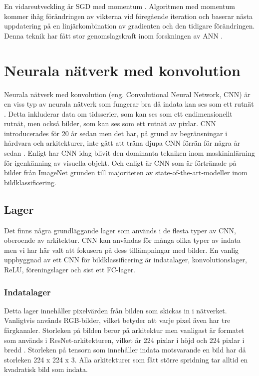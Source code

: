 \documentclass[]{kththesis}
\begin{document}
En vidareutveckling är SGD med momentum \parencite{qian1999momentum}. Algoritmen med momentum kommer ihåg förändringen av vikterna vid föregående iteration och baserar nästa uppdatering på en linjärkombination av gradienten och den tidigare förändringen. Denna teknik har fått stor genomslagskraft inom forskningen av ANN \parencite{sutskever2013importance}.

\section{Neurala nätverk med konvolution}
Neurala nätverk med konvolution (eng. Convolutional Neural Network, CNN) är en viss typ av neurala nätverk som fungerar bra då indata kan ses som ett rutnät \parencite{Goodfellow-et-al-2016}. Detta inkluderar data om tidsserier, som kan ses som ett endimensionellt rutnät, men också bilder, som kan ses som ett rutnät av pixlar. CNN introducerades för 20 år sedan men det har, på grund av begränsningar i hårdvara och arkitekturer, inte gått att träna djupa CNN förrän för några år sedan \parencite{huang2017densely}. Enligt \textcite{huang2017densely} har CNN idag blivit den dominanta tekniken inom maskininlärning för igenkänning av visuella objekt. Och enligt \textcite{simon2016imagenet} är CNN som är förtränade på bilder från ImageNet grunden till majoriteten av state-of-the-art-modeller inom bildklassificering.

\subsection{Lager}
Det finns några grundläggande lager som används i de flesta typer av CNN, oberoende av arkitektur. CNN kan användas för många olika typer av indata men vi har här valt att fokusera på dess tillämpningar med bilder. En vanlig uppbyggnad av ett CNN för bildklassificering är indatalager, konvolutionslager, ReLU, föreningslager och sist ett FC-lager.

\subsubsection{Indatalager}
Detta lager innehåller pixel\-värden från bild\-en som skickas in i nät\-verk\-et. Van\-ligt\-vis används RGB-bilder, vilket betyder att varje pixel även har tre färg\-kanaler. Stor\-leken på bilden beror på arkitektur men vanligast är formatet som används i ResNet-arkitekturen, vilket är 224 pixlar i höjd och 224 pixlar i bredd \parencite{krizhevsky2012imagenet}. Storleken på tensorn som innehåller indata motsvarande en bild har då storleken 224 x 224 x 3. Alla arkitekturer som fått större spridning tar alltid en kvadratisk bild som indata.
\end{document}
